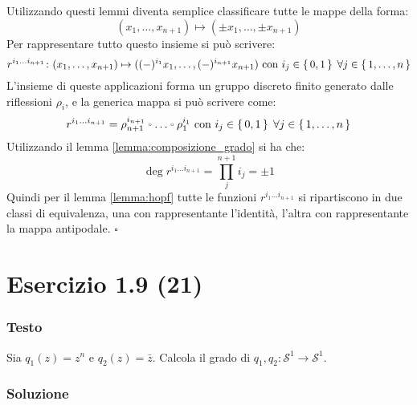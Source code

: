 \documentclass[10pt, toc=sectionentrywithdots]{scrartcl}
\newcommand{\Sph}[1][]{\mathcal{S}^#1}
\let\latexcirc=\circ
\newcommand{\ccirc}{\mathbin{\mathchoice
  {\xcirc\scriptstyle}
  {\xcirc\scriptstyle}
  {\xcirc\scriptscriptstyle}
  {\xcirc\scriptscriptstyle}
}}
\newcommand{\xcirc}[1]{\vcenter{\hbox{$#1\latexcirc$}}}
\let\circ\ccirc
\begin{document}
\noindent
Utilizzando questi lemmi diventa %
semplice classificare tutte le mappe della forma:
\[
  (x_1, \dots, x_{n+1}) \mapsto (\pm x_1, \dots, \pm x_{n+1})
\]
Per rappresentare tutto questo insieme si può scrivere:
\[
   r^{i_1\dots i_{n+1}} \colon (x_1, \dots, x_{n+1}) \mapsto ( (-)^{i_1} x_1, \dots, (-)^{i_{n+1}} x_{n+1}) \text{ con } i_j \in \set{0,1} \; \forall j \in \set{1,\dots, n}
\]
L'insieme di queste applicazioni forma un gruppo discreto finito
generato dalle riflessioni $ \rho_i $, e la generica mappa si può
scrivere come:
\[
  r^{i_1\dots i_{n+1}} = \rho_{n+1}^{i_{n+1}} \circ \dots \circ \rho_{1}^{i_{1}} \text{ con } i_j \in \set{0,1} \; \forall j \in \set{1,\dots, n}
\]
Utilizzando il lemma \ref{lemma:composizione_grado} si ha che:
\[
  \deg r^{i_1\dots i_{n+1}} = \prod_j^{n+1} i_{j} = \pm 1
\]
Quindi per il lemma \ref{lemma:hopf} tutte le funzioni $ r^{i_1\dots i_{n+1}} $ si
ripartiscono in due classi di equivalenza, una con rappresentante l'identità,
l'altra con rappresentante la mappa antipodale. \hfill $ \square $

\section[1.9 (21)]{Esercizio 1.9 (21)}

\subsubsection*{Testo}

Sia $ q_1 (z) = z^n $ e $ q_2(z) = \bar{z} $. Calcola il grado di $ q_1, q_2 \colon \Sph{1} \to \Sph{1} $.

\subsubsection*{Soluzione}
\end{document}
